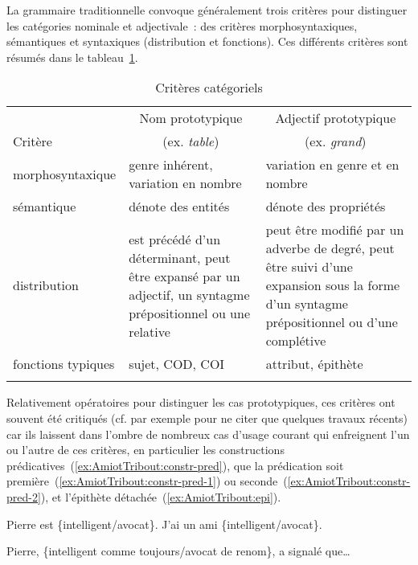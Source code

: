 \documentclass[output=paper]{LSP/langsci}
\begin{document}
La grammaire traditionnelle convoque généralement trois critères pour distinguer les catégories nominale et adjectivale~: des critères morphosyntaxiques, sémantiques et syntaxiques (distribution et fonctions). Ces différents critères sont résumés dans le tableau~\ref{tab:AmiotTribout:cat}. 

\begin{table}%
\caption{Critères catégoriels}
\label{tab:AmiotTribout:cat}
\small
\begin{tabular}{@{ }p{}p{}p{}@{ }}
 \lsptoprule
 & \multicolumn{1}{c}{Nom prototypique} & \multicolumn{1}{c}{Adjectif prototypique} \\
Critère & \multicolumn{1}{c}{(ex. \textit{table})} & \multicolumn{1}{c}{(ex. \textit{grand})} \\
\midrule
morphosyntaxique & genre inhérent, variation en nombre & variation en genre et en nombre \\[+0,2cm]
sémantique & dénote des entités & dénote des propriétés \\[+0,2cm]
distribution & est précédé d'un déterminant, peut être expansé par un adjectif, un syntagme prépositionnel ou une relative & peut être modifié par un adverbe de degré, peut être suivi d'une expansion sous la forme d'un syntagme prépositionnel ou d'une complétive  \\[+0,2cm]
fonctions typiques &  sujet, COD, COI & attribut, épithète\\
\lspbottomrule
\end{tabular}
\end{table}

Relativement opératoires pour distinguer les cas prototypiques, ces critères ont souvent été critiqués (cf. par exemple \cite{wierzbicka98, croft01, croft02, dixon02, haspelmath07} pour ne citer que quelques travaux récents) car ils laissent dans l'ombre de nombreux cas d'usage courant qui enfreignent l'un ou l'autre de ces critères, en particulier les constructions prédicatives~(\ref{ex:AmiotTribout:constr-pred}), que la prédication soit première~(\ref{ex:AmiotTribout:constr-pred-1}) ou seconde~(\ref{ex:AmiotTribout:constr-pred-2}), et l'épithète détachée~(\ref{ex:AmiotTribout:epi}).

\begin{exe}
\ex \label{ex:AmiotTribout:constr-pred}
\begin{xlist}
\ex \label{ex:AmiotTribout:constr-pred-1} Pierre est \{intelligent/avocat\}.
\ex \label{ex:AmiotTribout:constr-pred-2} J'ai un ami \{intelligent/avocat\}.
\end{xlist}

\ex \label{ex:AmiotTribout:epi} Pierre, \{intelligent comme toujours/avocat de renom\}, a signalé que\ldots
\end{exe}
\end{document}
